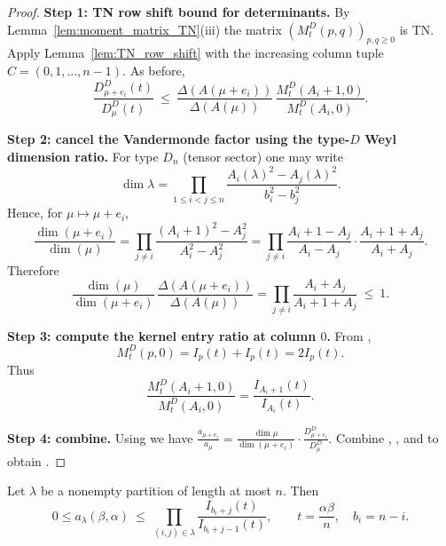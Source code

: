 \begin{proof}
\textbf{Step 1: TN row shift bound for determinants.}
By Lemma~\ref{lem:moment_matrix_TN}(iii) the matrix $(M_t^{D}(p,q))_{p,q\ge 0}$ is TN.
Apply Lemma~\ref{lem:TN_row_shift} with the increasing column tuple $C=(0,1,\dots,n-1)$.
As before,
\begin{equation}
\label{eq:SOeven_det_shift}
\frac{D^{D}_{\mu+e_i}(t)}{D^{D}_{\mu}(t)}
\ \le\ \frac{\Delta(A(\mu+e_i))}{\Delta(A(\mu))}\,\frac{M_t^{D}(A_i+1,0)}{M_t^{D}(A_i,0)}.
\end{equation}

\textbf{Step 2: cancel the Vandermonde factor using the type-$D$ Weyl dimension ratio.}
For type $D_n$ (tensor sector) one may write
\begin{equation}
\label{eq:SOeven_dim_formula}
\dim\lambda
=\prod_{1\le i<j\le n}\frac{A_i(\lambda)^2-A_j(\lambda)^2}{b_i^2-b_j^2}.
\end{equation}
Hence, for $\mu\mapsto\mu+e_i$,
\begin{equation}
\label{eq:SOeven_dim_ratio}
\frac{\dim(\mu+e_i)}{\dim(\mu)}
=\prod_{j\ne i}\frac{(A_i+1)^2-A_j^2}{A_i^2-A_j^2}
=\prod_{j\ne i}\frac{A_i+1-A_j}{A_i-A_j}\cdot\frac{A_i+1+A_j}{A_i+A_j}.
\end{equation}
Therefore
\begin{equation}
\label{eq:SOeven_dim_cancel}
\frac{\dim(\mu)}{\dim(\mu+e_i)}\,\frac{\Delta(A(\mu+e_i))}{\Delta(A(\mu))}
=\prod_{j\ne i}\frac{A_i+A_j}{A_i+1+A_j}\ \le\ 1.
\end{equation}

\textbf{Step 3: compute the kernel entry ratio at column $0$.}
From ,
\begin{equation}
\label{eq:SOeven_col0}
M_t^{D}(p,0)=I_p(t)+I_p(t)=2I_p(t).
\end{equation}
Thus
\begin{equation}
\label{eq:SOeven_Mratio}
\frac{M_t^{D}(A_i+1,0)}{M_t^{D}(A_i,0)}=\frac{I_{A_i+1}(t)}{I_{A_i}(t)}.
\end{equation}

\textbf{Step 4: combine.}
Using  we have
$\frac{a_{\mu+e_i}}{a_{\mu}}=\frac{\dim\mu}{\dim(\mu+e_i)}\cdot\frac{D^{D}_{\mu+e_i}}{D^{D}_{\mu}}$.
Combine , , and  to obtain .
\end{proof}

\begin{corollary}
\label{cor:SOeven_telescoping}
Let $\lambda$ be a nonempty partition of length at most $n$.
Then
\begin{equation}
\label{eq:SOeven_product_over_boxes}
0\le a_{\lambda}(\beta,\alpha)
\ \le\ \prod_{(i,j)\in\lambda}\frac{I_{b_i+j}(t)}{I_{b_i+j-1}(t)},
\qquad t=\frac{\alpha\beta}{n},\quad b_i=n-i.
\end{equation}
\end{corollary}

